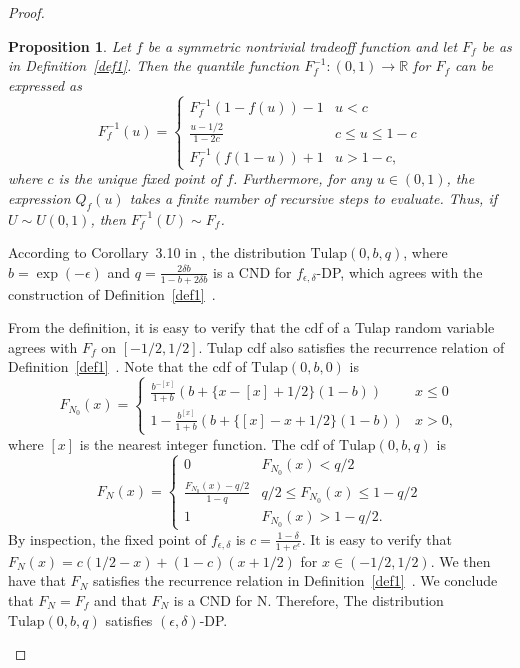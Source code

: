 \documentclass{article}
\newtheorem{prop}{Proposition}
\begin{document}
\begin{proof}
\begin{enumerate}
\begin{prop}\label{prop1}   %
    Let $f$ be a symmetric nontrivial tradeoff function and let $F_f$ be as in Definition~\ref{def1}. 
    Then the quantile function $F_f^{-1}:(0,1)\rightarrow \mathbb{R}$ for $F_f$ can be expressed as
    \[F_f^{-1}(u) = \begin{cases}
    F_f^{-1}(1-f(u))-1&u<c\\
    \frac{u-1/2}{1-2c}&c\leq u\leq 1-c\\
    F_f^{-1}(f(1-u))+1&u>1-c,
    \end{cases}\]
    where $c$ is the unique fixed point of $f$. 
    {Furthermore, for any $u\in (0,1)$, the expression $Q_f(u)$ takes a finite number of recursive steps to evaluate. Thus,} 
    if $U\sim U(0,1)$, then $F_f^{-1}(U) \sim F_f$. 
\end{prop}

According to Corollary~3.10 in \cite{awan2023canonical}, 
the distribution $\mathrm{Tulap}(0,b,q)$, where $b=\exp(-\epsilon)$ and $q = \frac{2\delta b}{1-b+2\delta b}$ 
is a CND for $f_{\epsilon,\delta}$-DP, which agrees with the construction of Definition~\ref{def1}~\parencite{awan2023canonical}. 

From the definition, it is easy to verify that the cdf of a Tulap random variable agrees with $F_f$ on $[-1/2,1/2]$. 
Tulap cdf also satisfies the recurrence relation of Definition~\ref{def1}~\parencite{awan2023canonical}. 
Note that the cdf of $\mathrm{Tulap}(0,b,0)$ is 
\[F_{N_0}(x) = \begin{cases}
    \frac{b^{-[x]}}{1+b}(b+\{x-[x]+1/2\}(1-b))& x\leq 0\\
    1- \frac{b^{[x]}}{1+b}(b+\{[x]-x+1/2\}(1-b))&x>0,
\end{cases}\]
where $[x]$ is the nearest integer function. 
The cdf of $\mathrm{Tulap}(0,b,q)$ is
\[F_N(x) = \begin{cases}
    0&F_{N_0}(x)<q/2\\
    \frac{F_{N_0}(x)-q/2}{1-q}& q/2\leq F_{N_0}(x)\leq 1-q/2\\
    1&F_{N_0}(x)>1-q/2.
\end{cases}\]
By inspection, the fixed point of $f_{\epsilon,\delta}$ is $c=\frac{1-\delta}{1+e^\epsilon}$. 
It is easy to verify that $F_N(x) = c(1/2-x) + (1-c)(x+1/2)$ for $x\in (-1/2,1/2)$. 
We then have that $F_N$ satisfies the recurrence relation in Definition~\ref{def1}~\parencite{awan2023canonical}. 
We conclude that $F_N = F_f$ and that $F_N$ is a CND for N. Therefore, The distribution $\mathrm{Tulap}(0,b,q)$ satisfies $(\epsilon, \delta)$-DP.
\end{enumerate}
\end{proof}

\printbibliography
\end{document}
